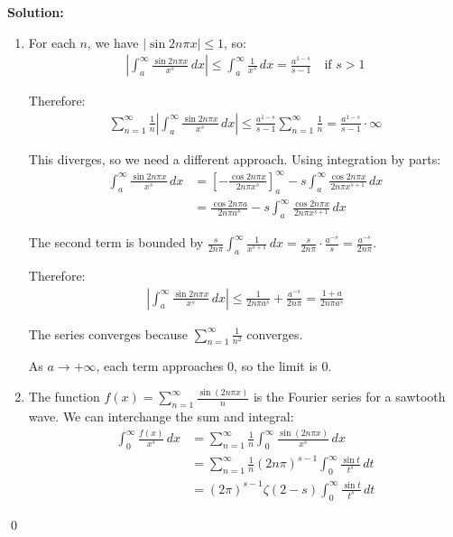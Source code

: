 \bigskip\noindent\textbf{Solution:}
\begin{enumerate}[label=(\alph*)]
\item For each $n$, we have $|\sin 2n\pi x| \leq 1$, so:
\begin{align*}
\left|\int_{a}^{\infty} \frac{\sin 2n\pi x}{x^{s}} \, dx\right| \leq \int_{a}^{\infty} \frac{1}{x^{s}} \, dx = \frac{a^{1-s}}{s-1} \quad \text{if } s > 1
\end{align*}

Therefore:
\begin{align*}
\sum_{n=1}^{\infty} \frac{1}{n} \left|\int_{a}^{\infty} \frac{\sin 2n\pi x}{x^{s}} \, dx\right| \leq \frac{a^{1-s}}{s-1} \sum_{n=1}^{\infty} \frac{1}{n} = \frac{a^{1-s}}{s-1} \cdot \infty
\end{align*}

This diverges, so we need a different approach. Using integration by parts:
\begin{align*}
\int_{a}^{\infty} \frac{\sin 2n\pi x}{x^{s}} \, dx &= \left[-\frac{\cos 2n\pi x}{2n\pi x^{s}}\right]_{a}^{\infty} - s \int_{a}^{\infty} \frac{\cos 2n\pi x}{2n\pi x^{s+1}} \, dx \\
&= \frac{\cos 2n\pi a}{2n\pi a^{s}} - s \int_{a}^{\infty} \frac{\cos 2n\pi x}{2n\pi x^{s+1}} \, dx
\end{align*}

The second term is bounded by $\frac{s}{2n\pi} \int_{a}^{\infty} \frac{1}{x^{s+1}} \, dx = \frac{s}{2n\pi} \cdot \frac{a^{-s}}{s} = \frac{a^{-s}}{2n\pi}$.

Therefore:
\begin{align*}
\left|\int_{a}^{\infty} \frac{\sin 2n\pi x}{x^{s}} \, dx\right| \leq \frac{1}{2n\pi a^{s}} + \frac{a^{-s}}{2n\pi} = \frac{1 + a}{2n\pi a^{s}}
\end{align*}

The series converges because $\sum_{n=1}^{\infty} \frac{1}{n^2}$ converges.

As $a \to +\infty$, each term approaches 0, so the limit is 0.

\item The function $f(x) = \sum_{n=1}^{\infty} \frac{\sin(2n\pi x)}{n}$ is the Fourier series for a sawtooth wave. We can interchange the sum and integral:
\begin{align*}
\int_{0}^{\infty} \frac{f(x)}{x^{s}} \, dx &= \sum_{n=1}^{\infty} \frac{1}{n} \int_{0}^{\infty} \frac{\sin(2n\pi x)}{x^{s}} \, dx \\
&= \sum_{n=1}^{\infty} \frac{1}{n} (2n\pi)^{s-1} \int_{0}^{\infty} \frac{\sin t}{t^{s}} \, dt \\
&= (2\pi)^{s-1} \zeta(2-s) \int_{0}^{\infty} \frac{\sin t}{t^{s}} \, dt
\end{align*}
\end{enumerate}\qed


